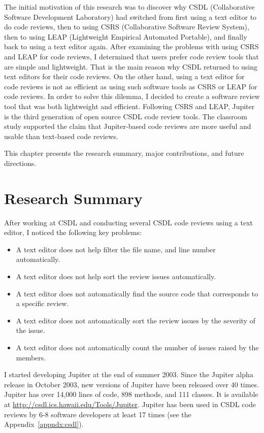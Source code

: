 The initial motivation of this research was to discover why CSDL (Collaborative Software Development Laboratory) had switched from first using a text editor to do code reviews, then to using CSRS (Collaborative Software Review System), then to using LEAP (Lightweight Empirical Automated Portable), and finally back to using a text editor again. After examining the problems with using CSRS and LEAP for code reviews, I determined that users prefer code review tools that are simple and lightweight. That is the main reason why CSDL returned to using text editors for their code reviews. On the other hand, using a text editor for code reviews is not as efficient as using such software tools as CSRS or LEAP for code reviews. In order to solve this dilemma, I decided to create a software review tool that was both lightweight and efficient. Following CSRS and LEAP, Jupiter is the third generation of open source CSDL code review tools. The classroom study supported the claim that Jupiter-based code reviews are more useful and usable than text-based code reviews.

This chapter presents the research summary, major contributions, and future directions.

\section{Research Summary}
\label{sec:research-summary}

After working at CSDL and conducting several CSDL code reviews using a text editor, I noticed the following key problems:

\begin{itemize}
	\item A text editor does not help filter the file name, and line number automatically.
	\item A text editor does not help sort the review issues automatically.
	\item A text editor does not automatically find the source code that corresponds to a specific review.
	\item A text editor does not automatically sort the review issues by the severity of the issue.
	\item A text editor does not automatically count the number of issues raised by the members.
\end{itemize}

I started developing Jupiter at the end of summer 2003. Since the Jupiter alpha release in October 2003, new versions of Jupiter have been released over 40 times. Jupiter has over 14,000 lines of code, 898 methods, and 111 classes. It is available at \url{http://csdl.ics.hawaii.edu/Tools/Jupiter}. Jupiter has been used in CSDL code reviews by 6-8 software developers at least 17 times (see the Appendix~\ref{appndx:csdl}).

